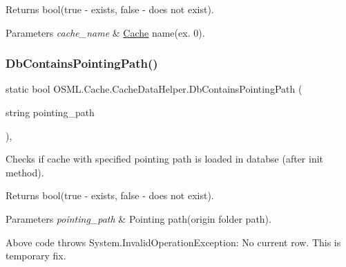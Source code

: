 \begin{DoxyReturn}{Returns}
bool(true -\/ exists, false -\/ does not exist). 
\end{DoxyReturn}

\begin{DoxyParams}{Parameters}
{\em cache\+\_\+name} & \mbox{\hyperlink{namespaceOSML_1_1Cache}{Cache}} name(ex. 0).\\
\hline
\end{DoxyParams}
\mbox{\label{classOSML_1_1Cache_1_1CacheDataHelper_a84f1e547e99fbc5f223786d39c605e83}} 
\subsubsection{\texorpdfstring{DbContainsPointingPath()}{DbContainsPointingPath()}}
{\footnotesize\ttfamily static bool O\+S\+M\+L.\+Cache.\+Cache\+Data\+Helper.\+Db\+Contains\+Pointing\+Path (\begin{DoxyParamCaption}\item[{string}]{pointing\+\_\+path }\end{DoxyParamCaption})\hspace{0.3cm}{\ttfamily [inline]}, {\ttfamily [static]}}



Checks if cache with specified pointing path is loaded in databse (after init method). 

\begin{DoxyReturn}{Returns}
bool(true -\/ exists, false -\/ does not exist). 
\end{DoxyReturn}

\begin{DoxyParams}{Parameters}
{\em pointing\+\_\+path} & Pointing path(origin folder path).\\
\hline
\end{DoxyParams}
Above code throws System.\+Invalid\+Operation\+Exception\+: No current row. This is temporary fix. \mbox{\label{classOSML_1_1Cache_1_1CacheDataHelper_ae5e19c58ce564389ec25728aad35ffa4}} 
